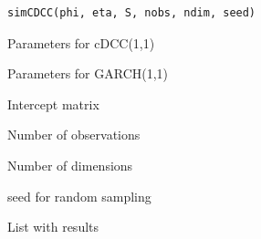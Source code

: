 \documentclass[letterpaper]{book}
\begin{document}
%
\begin{Usage}
\begin{verbatim}
simCDCC(phi, eta, S, nobs, ndim, seed)
\end{verbatim}
\end{Usage}
%
\begin{Arguments}
\begin{ldescription}
\item[\code{phi}] Parameters for cDCC(1,1)

\item[\code{eta}] Parameters for GARCH(1,1)

\item[\code{S}] Intercept matrix

\item[\code{nobs}] Number of observations

\item[\code{ndim}] Number of dimensions

\item[\code{seed}] seed for random sampling
\end{ldescription}
\end{Arguments}
%
\begin{Value}
List with results
\end{Value}
\printindex{}
\end{document}
